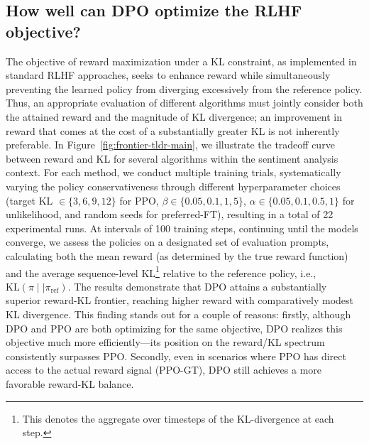 \subsection{How well can DPO optimize the RLHF objective?}

The objective of reward maximization under a KL constraint, as implemented in standard RLHF approaches, seeks to enhance reward while simultaneously preventing the learned policy from diverging excessively from the reference policy. Thus, an appropriate evaluation of different algorithms must jointly consider both the attained reward and the magnitude of KL divergence; an improvement in reward that comes at the cost of a substantially greater KL is not inherently preferable. In Figure~\ref{fig:frontier-tldr-main}, we illustrate the tradeoff curve between reward and KL for several algorithms within the sentiment analysis context. For each method, we conduct multiple training trials, systematically varying the policy conservativeness through different hyperparameter choices (target KL $\in\{3,6,9,12\}$ for PPO, $\beta \in \{0.05,0.1,1,5\}$, $\alpha\in\{0.05,0.1,0.5,1\}$ for unlikelihood, and random seeds for preferred-FT), resulting in a total of 22 experimental runs. At intervals of 100 training steps, continuing until the models converge, we assess the policies on a designated set of evaluation prompts, calculating both the mean reward (as determined by the true reward function) and the average sequence-level KL\footnote{This denotes the aggregate over timesteps of the KL-divergence at each step.} relative to the reference policy, i.e., $\text{KL}\left(\pi\mid \mid \pi_\text{ref}\right)$. The results demonstrate that DPO attains a substantially superior reward-KL frontier, reaching higher reward with comparatively modest KL divergence. This finding stands out for a couple of reasons: firstly, although DPO and PPO are both optimizing for the same objective, DPO realizes this objective much more efficiently—its position on the reward/KL spectrum consistently surpasses PPO. Secondly, even in scenarios where PPO has direct access to the actual reward signal (PPO-GT), DPO still achieves a more favorable reward-KL balance.

